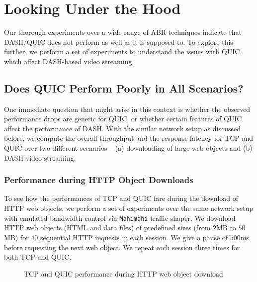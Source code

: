 \section{Looking Under the Hood}
Our thorough experiments over a wide range of ABR techniques indicate that DASH/QUIC does not perform as well as it is supposed to. To explore this further, we perform a set of experiments to understand the issues with QUIC, which affect DASH-based video streaming.

\subsection{Does QUIC Perform Poorly in All Scenarios?}
One immediate question that might arise in this context is whether the observed performance drops are generic for QUIC, or whether certain features of QUIC affect the performance of DASH. With the similar network setup as discussed before, we compute the overall throughput and the response latency for TCP and QUIC over two different scenarios -- (a) downloading of large web-objects and (b) DASH video streaming.


\subsubsection{Performance during HTTP Object Downloads}
To see how the performances of TCP and QUIC fare during the download of HTTP web objects, we perform a set of experiments over the same network setup with emulated bandwidth control via {\tt Mahimahi} traffic shaper. We download HTTP web objects (HTML and data files) of predefined sizes (from $2$MB to $50$MB) for $40$ sequential HTTP requests in each session. We give a pause of $500$ms before requesting the next web object. We repeat each session three times for both TCP and QUIC. 


\begin{figure}[!ht]
	\captionsetup[subfigure]{}
	\begin{center}
	\end{center}
	\caption{\label{fig:proofLargeFile}TCP and QUIC performance during HTTP web object download}
\end{figure}


